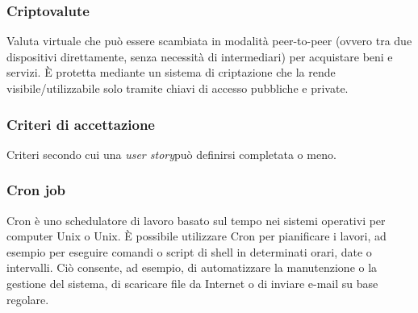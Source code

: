 \subsubsection*{Criptovalute}
Valuta virtuale che può essere scambiata in modalità peer-to-peer (ovvero tra due dispositivi direttamente, senza necessità di intermediari) per acquistare beni e servizi. È protetta mediante un sistema di criptazione che la rende visibile/utilizzabile solo tramite chiavi di accesso pubbliche e private. 

\subsubsection*{Criteri di accettazione}
Criteri secondo cui una \textit{user story}\glo può definirsi completata o meno.
\subsubsection*{Cron job}
Cron è uno schedulatore di lavoro basato sul tempo nei sistemi operativi per computer Unix o Unix. È possibile utilizzare Cron per pianificare i lavori, ad esempio per eseguire comandi o script di shell in determinati orari, date o intervalli. Ciò consente, ad esempio, di automatizzare la manutenzione o la gestione del sistema, di scaricare file da Internet o di inviare e-mail su base regolare.
